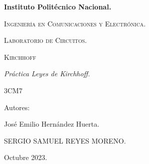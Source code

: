 \documentclass[10pt]{article}
\begin{document}
\pagestyle{fancy}
\cfoot{}


\lhead{}

\begin{titlepage}

	\begin{figure}[t]
		\hspace{0.6\textwidth}
	\end{figure}

	\centering
	{\bfseries\Huge Instituto Politécnico Nacional. \par}
	\vspace{1cm}
	{\scshape\Large Ingeniería en Comunicaciones y Electrónica. \par}
	\vspace{0.3cm}
	{\scshape\Large Laboratorio de Circuitos.  \par}
	\vspace{1cm}
	{\scshape\Huge Kirchhoff \par}
	\vspace{1cm}
	{\itshape\Large Práctica Leyes de Kirchhoff. \par}
	{\Large 3CM7\par}
	\vfill
	{\Large Autores: \par}
	{\Large José Emilio Hernández Huerta. \par}
	{\Large SERGIO SAMUEL REYES MORENO. \par}
	
	\vfill
	{\Large Octubre 2023. \par}

\end{titlepage}

\newpage
\end{document}

